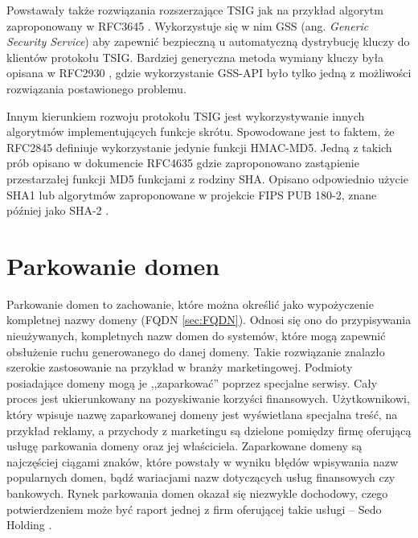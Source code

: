 Powstawały także rozwiązania rozszerzające TSIG jak na przykład algorytm zaproponowany w RFC3645 \cite{RFC3645}. Wykorzystuje się
w nim GSS \cite{RFC2743}(ang. \textit{Generic Security Service}) aby zapewnić bezpieczną u automatyczną dystrybucję kluczy do
klientów protokołu TSIG. Bardziej generyczna metoda wymiany kluczy była opisana w RFC2930 \cite{RFC2930}, gdzie wykorzystanie
GSS-API było tylko jedną z możliwości rozwiązania postawionego problemu.

Innym kierunkiem rozwoju protokołu TSIG jest wykorzystywanie innych algorytmów implementujących funkcje skrótu. Spowodowane
jest to faktem, że RFC2845 \cite{RFC2845} definiuje wykorzystanie jedynie funkcji HMAC-MD5. Jedną z takich prób opisano w
dokumencie RFC4635 \cite{RFC4635} gdzie zaproponowano zastąpienie przestarzałej funkcji MD5 funkcjami z rodziny SHA. Opisano
odpowiednio użycie SHA1 \cite{RFC3174} lub algorytmów zaproponowane w projekcie FIPS PUB 180-2, znane później jako SHA-2 \cite{RFC4634}.

\section{Parkowanie domen}
\noindent Parkowanie domen to zachowanie, które można określić jako wypożyczenie kompletnej nazwy domeny (FQDN \ref{sec:FQDN}).
Odnosi się ono do przypisywania nieużywanych, kompletnych nazw domen do systemów, które mogą zapewnić obsłużenie ruchu generowanego
do danej domeny. Takie rozwiązanie znalazło szerokie zastosowanie na przykład w branży marketingowej. Podmioty posiadające domeny mogą
je ,,zaparkować'' poprzez specjalne serwisy. Cały proces jest ukierunkowany na pozyskiwanie korzyści finansowych. Użytkownikowi,
który wpisuje nazwę zaparkowanej domeny jest wyświetlana specjalna treść, na przykład reklamy, a przychody z marketingu są dzielone
pomiędzy firmę oferującą usługę parkowania domeny oraz jej właściciela. Zaparkowane domeny są najczęściej ciągami znaków, które
powstały w wyniku błędów wpisywania nazw popularnych domen, bądź wariacjami nazw dotyczących usług finansowych czy bankowych.
Rynek parkowania domen okazał się niezwykle dochodowy, czego potwierdzeniem może być raport jednej z firm oferującej
takie usługi -- Sedo Holding \cite{sedo}.

